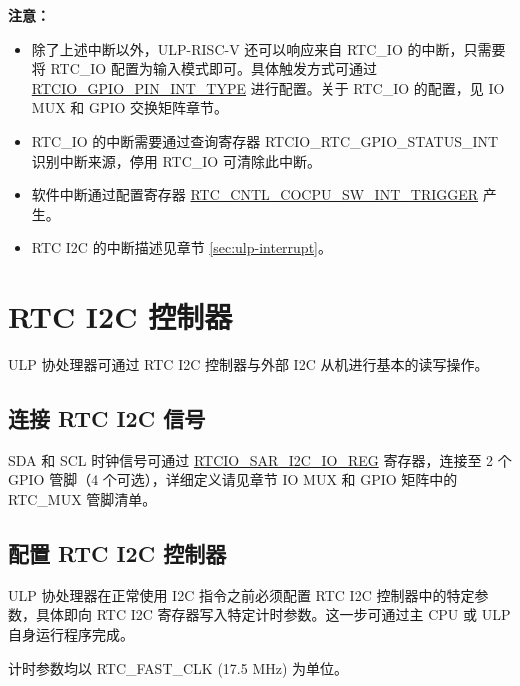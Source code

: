 \documentclass[main\_\_CN.tex]{subfiles}
\begin{document}
\textbf{注意：}
\begin{itemize}
    \item 除了上述中断以外，ULP-RISC-V 还可以响应来自 RTC\_IO 的中断，只需要将 RTC\_IO 配置为输入模式即可。具体触发方式可通过 \hyperref[fielddesc:RTCIOGPIOPINNINTTYPE]{RTCIO\_GPIO\_PIN\_INT\_TYPE} 进行配置。关于 RTC\_IO 的配置，见 IO MUX 和 GPIO 交换矩阵章节。
    \item RTC\_IO 的中断需要通过查询寄存器 RTCIO\_RTC\_GPIO\_STATUS\_INT 识别中断来源，停用 RTC\_IO 可清除此中断。
    \item 软件中断通过配置寄存器 \hyperref[fielddesc:RTCCNTLCOCPUSWINTTRIGGER]{RTC\_CNTL\_COCPU\_SW\_INT\_TRIGGER} 产生。
    \item RTC I2C 的中断描述见章节 \ref{sec:ulp-interrupt}。
\end{itemize}

\section{RTC I2C 控制器} \label{sec:RTC-I2C-Controller}

ULP 协处理器可通过 RTC I2C 控制器与外部 I2C 从机进行基本的读写操作。

\subsection{连接 RTC I2C 信号}

SDA 和 SCL 时钟信号可通过 \hyperref[regdesc:RTCIOSARI2CIOREG]{RTCIO\_SAR\_I2C\_IO\_REG} 寄存器，连接至 2 个 GPIO 管脚（4 个可选），详细定义请见章节 IO MUX 和 GPIO 矩阵中的 RTC\_MUX 管脚清单。

\subsection{配置 RTC I2C 控制器}

ULP 协处理器在正常使用 I2C 指令之前必须配置 RTC I2C 控制器中的特定参数，具体即向 RTC I2C 寄存器写入特定计时参数。这一步可通过主 CPU 或 ULP 自身运行程序完成。

\begin{tiplisting}
计时参数均以 RTC\_FAST\_CLK (17.5 MHz) 为单位。
\end{tiplisting}
\end{document}
